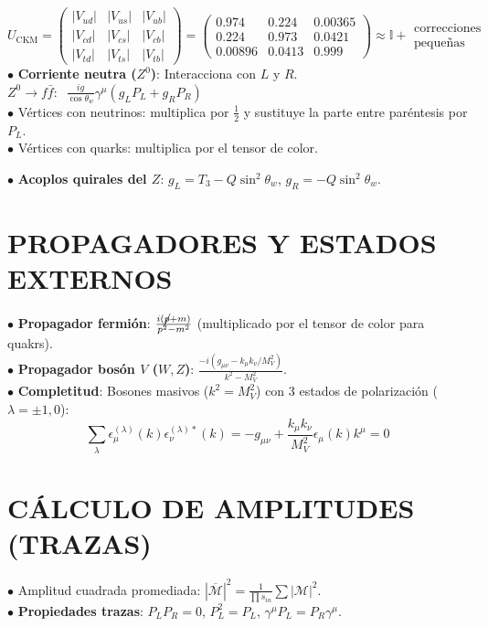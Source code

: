 $U_{\text{CKM}} = 
\begin{pmatrix}
|V_{ud} |& |V_{us}| & |V_{ub}| \\
|V_{cd}| & |V_{cs}| & |V_{cb} |\\
|V_{td}| & |V_{ts}| & |V_{tb}|
\end{pmatrix}
=
\begin{pmatrix}
0.974 & 0.224 & 0.00365 \\
0.224 & 0.973 & 0.0421 \\
0.00896 & 0.0413 & 0.999
\end{pmatrix}
\approx \mathbb{I} + 
\begin{array}{cc}
\text{correcciones}  \\
\text{pequeñas} 
\end{array}
$\\
$\bullet$ \textbf{Corriente neutra ($Z^0$)}: Interacciona con $L$ y $R$. $Z^0 \rightarrow f \bar{f}:\;\; \frac{ig}{\cos\theta_w}\gamma^\mu (g_L P_L + g_R P_R)$\\
$\bullet$ Vértices con neutrinos: multiplica por $\frac{1}{2}$ y sustituye la parte entre paréntesis por $P_L$.
\\$\bullet$ Vértices con quarks: multiplica por el tensor de color.

$\bullet$ \textbf{Acoplos quirales del $Z$}: $g_L = T_3 - Q\sin^2\theta_w$, $g_R = -Q\sin^2\theta_w$. 

\section{PROPAGADORES Y ESTADOS EXTERNOS}
$\bullet$ \textbf{Propagador fermión}: $\frac{i(\cancel{p}+m)}{p^2-m^2}$ (multiplicado por el tensor de color para quakrs). 
\\ $\bullet$ \textbf{Propagador bosón $V$ ($W, Z$)}: $\frac{-i(g_{\mu\nu} - k_\mu k_\nu/M_V^2)}{k^2-M_V^2}$. 
\\ $\bullet$ \textbf{Completitud}: Bosones masivos ($k^2 = M_V^2$) con 3 estados de polarización ($\lambda=\pm 1, 0$):
$$\sum_{\lambda} \epsilon_\mu^{(\lambda)}(k) \epsilon_\nu^{(\lambda)*}(k) = -g_{\mu\nu} + \frac{k_\mu k_\nu}{M_V^2} \epsilon_\mu(k) k^\mu = 0$$

\section{CÁLCULO DE AMPLITUDES (TRAZAS)}
$\bullet$ Amplitud cuadrada promediada: $|\overline{\mathcal{M}}|^2 = \frac{1}{\prod s_{in}} \sum |\mathcal{M}|^2$. 
\\ $\bullet$ \textbf{Propiedades trazas}: $P_L P_R = 0$, $P_L^2 = P_L$, $\gamma^\mu P_L = P_R \gamma^\mu$. 

